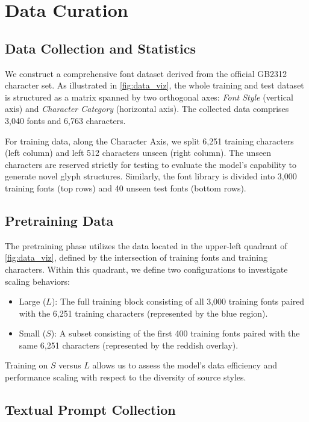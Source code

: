 \section{Data Curation}
\label{sec:data_dist}

\subsection{Data Collection and Statistics}
\label{ssec:data_stats}
We construct a comprehensive font dataset derived from the official GB2312 character set. As illustrated in \cref{fig:data_viz}, the whole training and test dataset is structured as a matrix spanned by two orthogonal axes: \textit{Font Style} (vertical axis) and \textit{Character Category} (horizontal axis). 
The collected data comprises 3,040 fonts and 6,763 characters. 

For training data, along the Character Axis, we split 6,251 training characters (left column) and left 512 characters unseen (right column). The unseen characters are reserved strictly for testing to evaluate the model's capability to generate novel glyph structures. Similarly, the font library is divided into 3,000 training fonts (top rows) and 40 unseen test fonts (bottom rows).


\subsection{Pretraining Data}
\label{ssec:data_pretrain}
The pretraining phase utilizes the data located in the upper-left quadrant of \cref{fig:data_viz}, defined by the intersection of training fonts and training characters. Within this quadrant, we define two configurations to investigate scaling behaviors:
\begin{itemize}[leftmargin=*]
    \item Large ($L$): The full training block consisting of all 3,000 training fonts paired with the 6,251 training characters (represented by the blue region).
    \item Small ($S$): A subset consisting of the first 400 training fonts paired with the same 6,251 characters (represented by the reddish overlay).
\end{itemize}
Training on $S$ versus $L$ allows us to assess the model's data efficiency and performance scaling with respect to the diversity of source styles.

\subsection{Textual Prompt Collection}
\label{ssec:prompt}

